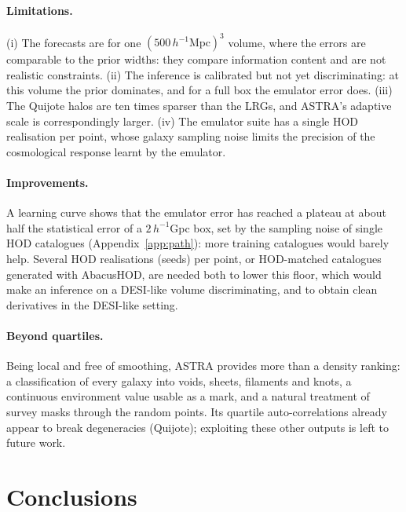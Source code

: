 \documentclass[11pt,twocolumn]{article}
\newcommand{\Mpch}{\,h^{-1}\mathrm{Mpc}}
\begin{document}
\paragraph{Limitations.} (i) The forecasts are for one $(500\Mpch)^3$ volume, where the errors are comparable to the prior widths: they compare information content and are not realistic constraints. (ii) The inference is calibrated but not yet discriminating: at this volume the prior dominates, and for a full box the emulator error does. (iii) The Quijote halos are ten times sparser than the LRGs, and ASTRA's adaptive scale is correspondingly larger. (iv) The emulator suite has a single HOD realisation per point, whose galaxy sampling noise limits the precision of the cosmological response learnt by the emulator.

\paragraph{Improvements.} A learning curve shows that the emulator error has reached a plateau at about half the statistical error of a $2\,h^{-1}$Gpc box, set by the sampling noise of single HOD catalogues (Appendix~\ref{app:path}): more training catalogues would barely help. Several HOD realisations (seeds) per point, or HOD-matched catalogues generated with AbacusHOD, are needed both to lower this floor, which would make an inference on a DESI-like volume discriminating, and to obtain clean derivatives in the DESI-like setting.

\paragraph{Beyond quartiles.} Being local and free of smoothing, ASTRA provides more than a density ranking: a classification of every galaxy into voids, sheets, filaments and knots, a continuous environment value usable as a mark, and a natural treatment of survey masks through the random points. Its quartile auto-correlations already appear to break degeneracies (Quijote); exploiting these other outputs is left to future work.

\section{Conclusions}
\end{document}
